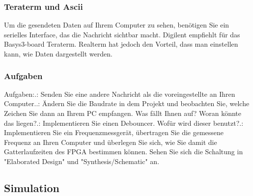\documentclass{article}
\begin{document}
\subsubsection{Teraterm und Ascii}
Um die gesendeten Daten auf Ihrem Computer zu sehen, ben\"otigen Sie ein serielles Interface, das die Nachricht sichtbar macht. Digilent empfiehlt f\"ur das Basys3-board Teraterm. Realterm hat jedoch den Vorteil, dass man einstellen kann, wie Daten dargestellt werden.

\subsubsection{Aufgaben}

Aufgaben:.: Senden Sie eine andere Nachricht als die voreingestellte an Ihren Computer..: Ändern Sie die Baudrate in dem Projekt und beobachten Sie, welche Zeichen Sie dann an Ihrem PC empfangen. Was f\"allt Ihnen auf? Woran k\"onnte das liegen?.: Implementieren Sie einen Debouncer. Wof\"ur wird dieser benutzt?.: Implementieren Sie ein Frequenzmessger\"at, \"ubertragen Sie die gemessene Frequenz an Ihren Computer  und \"uberlegen Sie sich, wie Sie damit die Gatterlaufzeiten des FPGA bestimmen k\"onnen. Sehen Sie sich die Schaltung in "Elaborated Design" und "Synthesis/Schematic" an.\newline

\subsection{Simulation}
\end{document}
